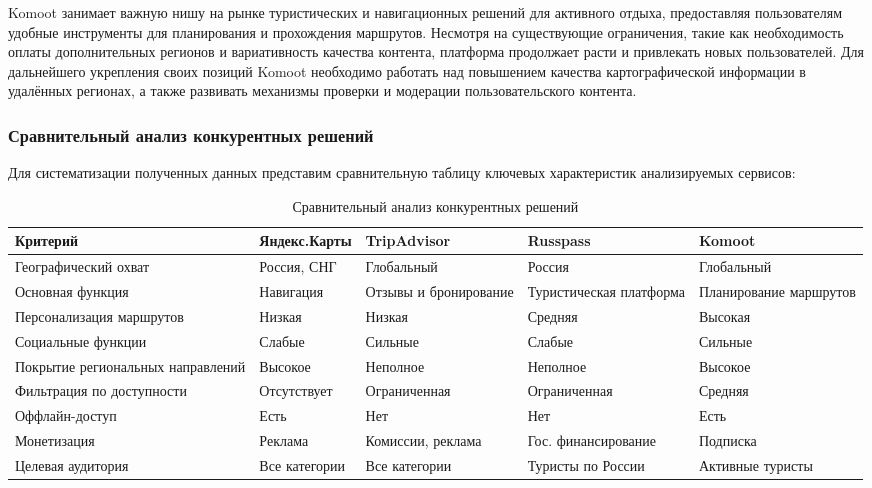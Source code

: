 \noindent Komoot занимает важную нишу на рынке туристических и навигационных решений для активного отдыха, предоставляя пользователям удобные инструменты для планирования и прохождения маршрутов. Несмотря на существующие ограничения, такие как необходимость оплаты дополнительных регионов и вариативность качества контента, платформа продолжает расти и привлекать новых пользователей. Для дальнейшего укрепления своих позиций Komoot необходимо работать над повышением качества картографической информации в удалённых регионах, а также развивать механизмы проверки и модерации пользовательского контента.

\subsubsection*{Сравнительный анализ конкурентных решений}

Для систематизации полученных данных представим сравнительную таблицу ключевых характеристик анализируемых сервисов:

\begin{table}[h]
\centering
\small
\begin{tabular}{| p{35mm} | p{25mm} | p{25mm} | p{25mm} | p{25mm} |}
\hline
\textbf{Критерий} & \textbf{Яндекс.Карты} & \textbf{TripAdvisor} & \textbf{Russpass} & \textbf{Komoot} \\
\hline
Географический охват & Россия, СНГ & Глобальный & Россия & Глобальный \\
\hline
Основная функция & Навигация & Отзывы и бронирование & Туристическая платформа & Планирование маршрутов \\
\hline
Персонализация маршрутов & Низкая & Низкая & Средняя & Высокая \\
\hline
Социальные функции & Слабые & Сильные & Слабые & Сильные \\
\hline
Покрытие региональных направлений & Высокое & Неполное & Неполное & Высокое \\
\hline
Фильтрация по доступности & Отсутствует & Ограниченная & Ограниченная & Средняя \\
\hline
Оффлайн-доступ & Есть & Нет & Нет & Есть \\
\hline
Монетизация & Реклама & Комиссии, реклама & Гос. финансирование & Подписка \\
\hline
Целевая аудитория & Все категории & Все категории & Туристы по России & Активные туристы \\
\hline
\end{tabular}
\caption{Сравнительный анализ конкурентных решений}
\end{table}


